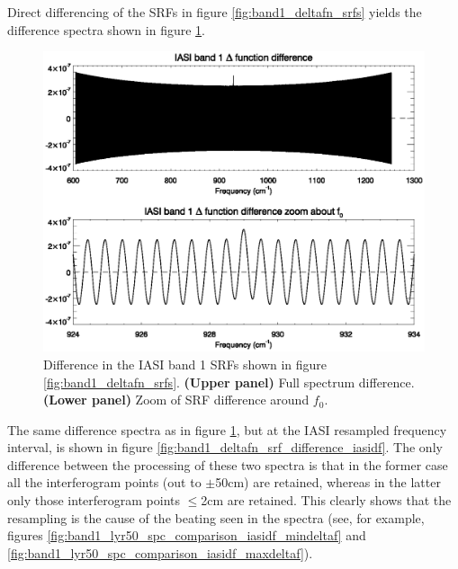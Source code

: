 Direct differencing of the SRFs in figure \ref{fig:band1_deltafn_srfs} yields the difference spectra shown in figure \ref{fig:band1_deltafn_srf_difference}.

\begin{figure}[htp]
  \centering
  \includegraphics[scale=0.8]{graphics/band1_deltafn_srf_difference.eps}
  \caption{Difference in the IASI band 1 SRFs shown in figure \ref{fig:band1_deltafn_srfs}. \textbf{(Upper panel)} Full spectrum difference. \textbf{(Lower panel)} Zoom of SRF difference around $f_{0}$.}
  \label{fig:band1_deltafn_srf_difference}
\end{figure}

The same difference spectra as in figure \ref{fig:band1_deltafn_srf_difference}, but at the IASI resampled frequency interval, is shown in figure \ref{fig:band1_deltafn_srf_difference_iasidf}. The only difference between the processing of these two spectra is that in the former case all the interferogram points (out to $\pm$50cm) are retained, whereas in the latter only those interferogram points $\leq$2cm are retained. This clearly shows that the resampling is the cause of the beating seen in the spectra (see, for example, figures \ref{fig:band1_lyr50_spc_comparison_iasidf_mindeltaf} and \ref{fig:band1_lyr50_spc_comparison_iasidf_maxdeltaf}).

